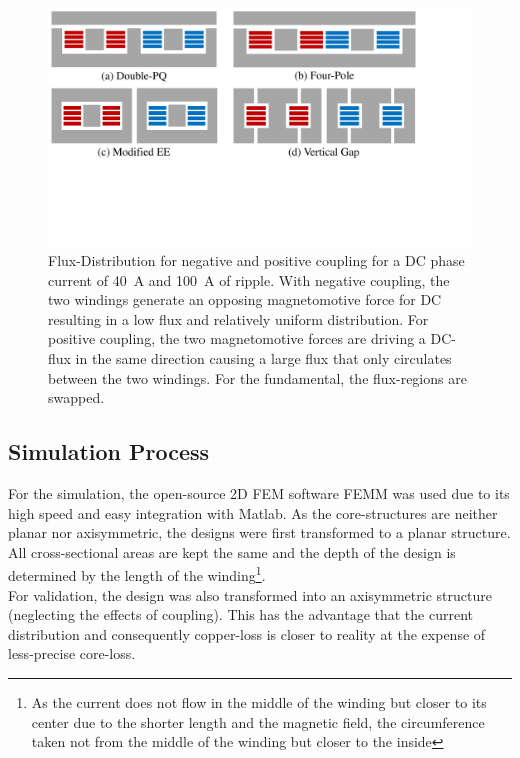 \documentclass{IPEC2026}
\begin{document}
\begin{figure}
  \includegraphics[page=5, trim = 0cm 1cm 3.5cm 0cm, clip, width=\columnwidth]{figures/IPEC_Figures_PowerPoint.pdf}
  \caption{Flux-Distribution for negative and positive coupling for a DC phase current of \qty{40}{\A} and \qty{100}{\A} of ripple. With negative coupling, the two windings generate an opposing magnetomotive force for DC resulting in a low flux and relatively uniform distribution. For positive coupling, the two magnetomotive forces are driving a DC-flux in the same direction causing a large flux that only circulates between the two windings. For the fundamental, the flux-regions are swapped.}
  \label{fig:Fluxposneg}
\end{figure}

\subsection{Simulation Process}
For the simulation, the open-source 2D FEM software FEMM was used due to its high speed and easy integration with Matlab. As the core-structures are neither planar nor axisymmetric, the designs were first transformed to a planar structure. All cross-sectional areas are kept the same and the depth of the design is determined by the length of the winding\footnote{As the current does not flow in the middle of the winding but closer to its center due to the shorter length and the magnetic field, the circumference taken not from the middle of the winding but closer to the inside}. \\
For validation, the design was also transformed into an axisymmetric structure (neglecting the effects of coupling). This has the advantage that the current distribution and consequently copper-loss is closer to reality at the expense of less-precise core-loss.
\end{document}
